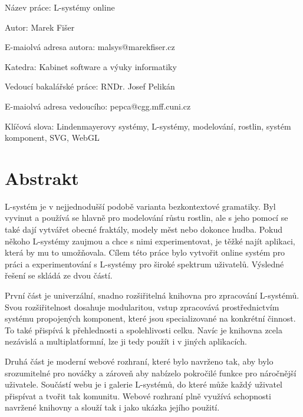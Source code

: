 
{
\setlength\parindent{0mm}
\setlength\parskip{5mm}

Název práce: L-systémy online

Autor: Marek Fišer

E-maiolvá adresa autora: malsys@marekfiser.cz

Katedra: Kabinet software a výuky informatiky

Vedoucí bakalářské práce: RNDr. Josef Pelikán

E-maiolvá adresa vedoucího: pepca@cgg.mff.cuni.cz

Klíčová slova: Lindenmayerovy systémy, L-systémy, modelování, rostlin, systém komponent, SVG, WebGL

\section*{Abstrakt}
}
\mbox{L-systém} je v nejjednodušší podobě varianta bezkontextové gramatiky.
Byl vyvi\-nut a používá se hlavně pro modelování růstu rostlin, ale s jeho pomocí se také dají vytvářet obecné fraktály, modely měst nebo dokonce hudba.
Pokud někoho \mbox{L-systémy} zaujmou a chce s nimi experimentovat, je těžké najít aplikaci, která by mu to umožňovala.
Cílem této práce bylo vytvořit online systém pro práci a experimentování s L-systémy pro široké spektrum uživatelů.
Výsledné řešení se skládá ze dvou částí.

První část je univerzální, snadno rozšiřitelná knihovna pro zpracování \mbox{L-sys}\-témů.
Svou rozšiřitelnost dosahuje modularitou, vstup zpracovává pros\-třednic\-tvím systému propojených komponent, které jsou specializované na kon\-krét\-ní činnost.
To také přispívá k přehlednosti a spolehlivosti celku.
Navíc je knihovna zcela nezávislá a multiplatformní, lze ji tedy použít i v jiných aplikacích.

Druhá část je moderní webové rozhraní, které bylo navrženo tak, aby bylo srozumitelné pro nováčky a zároveň aby nabízelo pokročilé funkce pro nároč\-nější uživatele.
Součástí webu je i galerie L-systémů, do které může každý uživatel přispívat a tvořit tak komunitu.
Webové rozhraní plně využívá schopnosti navr\-žené knihovny a slouží tak i jako ukázka jejího použití.

\newpage

